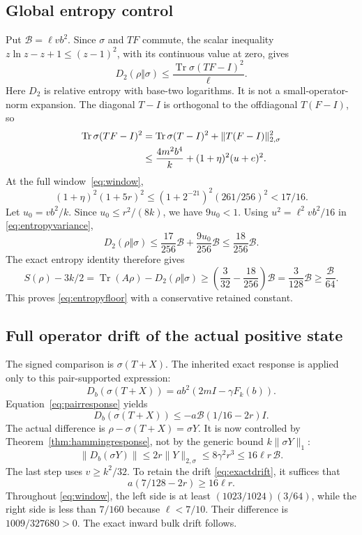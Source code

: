 \documentclass[11pt]{article}
\newcommand{\Tr}{\operatorname{Tr}}
\newcommand{\norm}[1]{\lVert #1\rVert}
\newcommand{\wn}[1]{\lVert #1\rVert_{2,\sigma}}
\begin{document}
\subsection{Global entropy control}

Put \(\mathcal B=\ell vb^2\). Since \(\sigma\) and \(TF\) commute,
the scalar inequality \(z\ln z-z+1\le(z-1)^2\), with its continuous
value at zero, gives
\[
 D_2(\rho\Vert\sigma)\le\frac{\Tr\sigma(TF-I)^2}{\ell}.
\]
Here \(D_2\) is relative entropy with base-two logarithms. It is not a
small-operator-norm expansion. The diagonal \(T-I\) is orthogonal to
the offdiagonal \(T(F-I)\), so
\begin{align}
 \Tr\sigma(TF-I)^2
 &=\Tr\sigma(T-I)^2+\wn{T(F-I)}^2\notag\\
 &\le\frac{4m^2b^4}{k}+(1+\eta)^2(u+e)^2.\label{eq:entropyvariance}
\end{align}
At the full window~\eqref{eq:window},
\[
 (1+\eta)^2(1+5r)^2
 \le(1+2^{-21})^2(261/256)^2<17/16.
\]
Let \(u_0=vb^2/k\). Since \(u_0\le r^2/(8k)\), we have \(9u_0<1\).
Using \(u^2=\ell^2vb^2/16\) in \eqref{eq:entropyvariance},
\[
 D_2(\rho\Vert\sigma)
 \le\frac{17}{256}\mathcal B+\frac{9u_0}{256}\mathcal B
 \le\frac{18}{256}\mathcal B.
\]
The exact entropy identity therefore gives
\[
 S(\rho)-3k/2
 =\Tr(A\rho)-D_2(\rho\Vert\sigma)
 \ge\left(\frac3{32}-\frac{18}{256}\right)\mathcal B
 =\frac{3}{128}\mathcal B\ge\frac{\mathcal B}{64}.
\]
This proves \eqref{eq:entropyfloor} with a conservative retained constant.

\subsection{Full operator drift of the actual positive state}

The signed comparison is \(\sigma(T+X)\). The inherited exact response
is applied only to this pair-supported expression:
\[
 D_b(\sigma(T+X))=ab^2(2mI-\gamma F_k(b)).
\]
Equation~\eqref{eq:pairresponse} yields
\begin{equation}\label{eq:affinedrift}
 D_b(\sigma(T+X))
 \le-a\mathcal B(1/16-2r)I.
\end{equation}
The actual difference is \(\rho-\sigma(T+X)=\sigma Y\).
It is now controlled by Theorem~\ref{thm:hammingresponse}, not by the
generic bound \(k\norm{\sigma Y}_1\):
\[
 \norm{D_b(\sigma Y)}\le2r\wn Y
 \le8\gamma^2r^3\le16\ell r\,\mathcal B.
\]
The last step uses \(v\ge k^2/32\). To retain the drift
\eqref{eq:exactdrift}, it suffices that
\[
 a(7/128-2r)\ge16\ell r.
\]
Throughout \eqref{eq:window}, the left side is at least
\((1023/1024)(3/64)\), while the right side is less than \(7/160\)
because \(\ell<7/10\). Their difference is \(1009/327680>0\).
The exact inward bulk drift follows.
\end{document}
